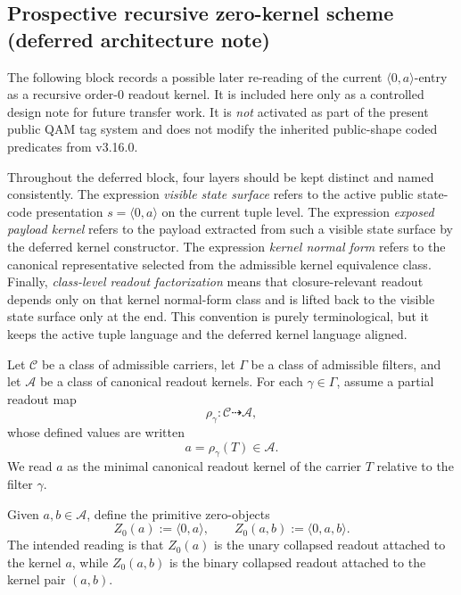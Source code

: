 \subsection*{Prospective recursive zero-kernel scheme (deferred architecture note)}

The following block records a possible later re-reading of the current $\langle 0,a\rangle$-entry as a recursive order-$0$ readout kernel. It is included here only as a controlled design note for future transfer work. It is \emph{not} activated as part of the present public QAM tag system and does not modify the inherited public-shape coded predicates from v3.16.0.

\begin{remark}\label{rem:qam-zero-kernel-terminology}
Throughout the deferred block, four layers should be kept distinct and named consistently. The expression \emph{visible state surface} refers to the active public state-code presentation $s=\langle 0,a\rangle$ on the current tuple level. The expression \emph{exposed payload kernel} refers to the payload extracted from such a visible state surface by the deferred kernel constructor. The expression \emph{kernel normal form} refers to the canonical representative selected from the admissible kernel equivalence class. Finally, \emph{class-level readout factorization} means that closure-relevant readout depends only on that kernel normal-form class and is lifted back to the visible state surface only at the end. This convention is purely terminological, but it keeps the active tuple language and the deferred kernel language aligned.
\end{remark}

\begin{definition}\label{def:qam-zero-kernel}
Let $\mathcal C$ be a class of admissible carriers, let $\Gamma$ be a class of admissible filters, and let $\mathcal A$ be a class of canonical readout kernels. For each $\gamma\in\Gamma$, assume a partial readout map
\[
\rho_\gamma:\mathcal C \dashrightarrow \mathcal A,
\]
whose defined values are written
\[
a=\rho_\gamma(T)\in\mathcal A.
\]
We read $a$ as the minimal canonical readout kernel of the carrier $T$ relative to the filter $\gamma$.
\end{definition}

\begin{definition}\label{def:qam-zero-objects}
Given $a,b\in\mathcal A$, define the primitive zero-objects
\[
Z_0(a):=\langle 0,a\rangle,
\qquad
Z_0(a,b):=\langle 0,a,b\rangle.
\]
The intended reading is that $Z_0(a)$ is the unary collapsed readout attached to the kernel $a$, while $Z_0(a,b)$ is the binary collapsed readout attached to the kernel pair $(a,b)$.
\end{definition}

